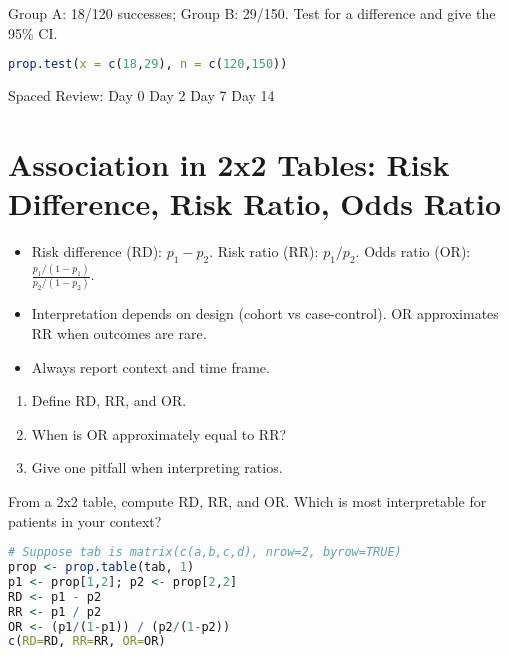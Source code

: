 \documentclass[11pt,a4paper]{article}
\def\textbf#1{#1}%
\newcommand{\reviewticks}{
  \vspace{0.4em}
  \noindent\scriptsize\textbf{Spaced Review:}
  \fbox{\phantom{D0}} Day 0\quad
  \fbox{\phantom{D2}} Day 2\quad
  \fbox{\phantom{D7}} Day 7\quad
  \fbox{\phantom{D14}} Day 14
}
\begin{document}
\begin{practicebox}
Group A: 18/120 successes; Group B: 29/150. Test for a difference and give the 95\% CI.
\end{practicebox}

\begin{rbox}
\begin{lstlisting}[language=R]
prop.test(x = c(18,29), n = c(120,150))
\end{lstlisting}
\end{rbox}

\reviewticks

\section{Association in 2x2 Tables: Risk Difference, Risk Ratio, Odds Ratio}

\begin{corebox}
\begin{itemize}
  \item Risk difference (RD): \(p_1 - p_2\). Risk ratio (RR): \(p_1/p_2\). Odds ratio (OR): \(\frac{p_1/(1-p_1)}{p_2/(1-p_2)}\).
  \item Interpretation depends on design (cohort vs case-control). OR approximates RR when outcomes are rare.
  \item Always report context and time frame.
\end{itemize}
\end{corebox}

\begin{recallbox}
\begin{enumerate}
  \item Define RD, RR, and OR.
  \item When is OR approximately equal to RR?
  \item Give one pitfall when interpreting ratios.
\end{enumerate}
\end{recallbox}

\begin{practicebox}
From a 2x2 table, compute RD, RR, and OR. Which is most interpretable for patients in your context?
\end{practicebox}

\begin{rbox}
\begin{lstlisting}[language=R]
# Suppose tab is matrix(c(a,b,c,d), nrow=2, byrow=TRUE)
prop <- prop.table(tab, 1)
p1 <- prop[1,2]; p2 <- prop[2,2]
RD <- p1 - p2
RR <- p1 / p2
OR <- (p1/(1-p1)) / (p2/(1-p2))
c(RD=RD, RR=RR, OR=OR)
\end{lstlisting}
\end{rbox}
\end{document}
